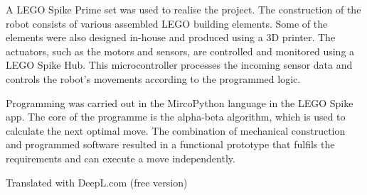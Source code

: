 A LEGO Spike Prime set was used to realise the project. The construction of the robot consists of various assembled LEGO building elements. Some of the elements were also designed in-house and produced using a 3D printer.  
The actuators, such as the motors and sensors, are controlled and monitored using a LEGO Spike Hub. This microcontroller processes the incoming sensor data and controls the robot's movements according to the programmed logic.

Programming was carried out in the MircoPython language in the LEGO Spike app.
The core of the programme is the alpha-beta algorithm, which is used to calculate the next optimal move.
The combination of mechanical construction and programmed software resulted in a functional prototype that fulfils the requirements and can execute a move independently.

Translated with DeepL.com (free version)

\clearpage